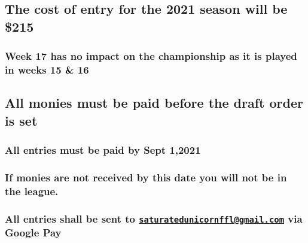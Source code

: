 \documentclass[
]{book}
\begin{document}
\hypertarget{the-cost-of-entry-for-the-2021-season-will-be-215}{%
\subsection{The cost of entry for the 2021 season will be \$215}\label{the-cost-of-entry-for-the-2021-season-will-be-215}}

\hypertarget{week-17-has-no-impact-on-the-championship-as-it-is-played-in-weeks-15-16}{%
\subsubsection{Week 17 has no impact on the championship as it is played in weeks 15 \& 16}\label{week-17-has-no-impact-on-the-championship-as-it-is-played-in-weeks-15-16}}

\hypertarget{all-monies-must-be-paid-before-the-draft-order-is-set}{%
\subsection{All monies must be paid before the draft order is set}\label{all-monies-must-be-paid-before-the-draft-order-is-set}}

\hypertarget{all-entries-must-be-paid-by-sept-12021}{%
\subsubsection{All entries must be paid by Sept 1,2021}\label{all-entries-must-be-paid-by-sept-12021}}

\hypertarget{if-monies-are-not-received-by-this-date-you-will-not-be-in-the-league.}{%
\subsubsection{If monies are not received by this date you will not be in the league.}\label{if-monies-are-not-received-by-this-date-you-will-not-be-in-the-league.}}

\hypertarget{all-entries-shall-be-sent-to-saturatedunicornfflgmail.com-via-google-pay}{%
\subsubsection{\texorpdfstring{All entries shall be sent to \href{mailto:saturatedunicornffl@gmail.com}{\nolinkurl{saturatedunicornffl@gmail.com}} via Google Pay}{All entries shall be sent to saturatedunicornffl@gmail.com via Google Pay}}\label{all-entries-shall-be-sent-to-saturatedunicornfflgmail.com-via-google-pay}}
\end{document}
